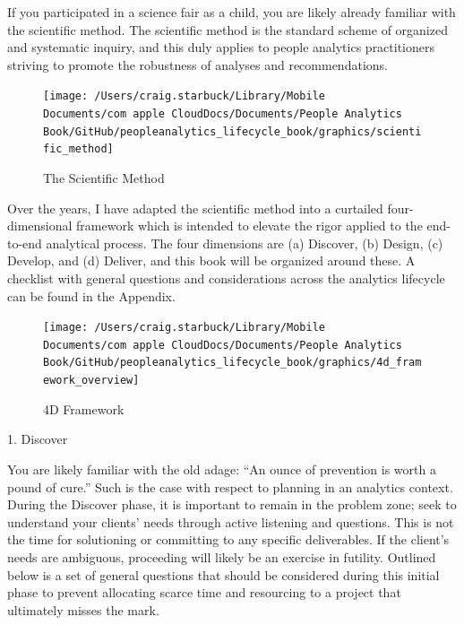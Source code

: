 \documentclass[]{book}
\begin{document}
If you participated in a science fair as a child, you are likely already familiar with the scientific method. The scientific method is the standard scheme of organized and systematic inquiry, and this duly applies to people analytics practitioners striving to promote the robustness of analyses and recommendations.

\begin{figure}

{\centering \texttt{[image: /Users/craig.starbuck/Library/Mobile Documents/com~apple~CloudDocs/Documents/People Analytics Book/GitHub/peopleanalytics\_lifecycle\_book/graphics/scientific\_method]} 

}

\caption{The Scientific Method}\label{fig:sci-method}
\end{figure}

Over the years, I have adapted the scientific method into a curtailed four-dimensional framework which is intended to elevate the rigor applied to the end-to-end analytical process. The four dimensions are (a) Discover, (b) Design, (c) Develop, and (d) Deliver, and this book will be organized around these. A checklist with general questions and considerations across the analytics lifecycle can be found in the Appendix.

\begin{figure}

{\centering \texttt{[image: /Users/craig.starbuck/Library/Mobile Documents/com~apple~CloudDocs/Documents/People Analytics Book/GitHub/peopleanalytics\_lifecycle\_book/graphics/4d\_framework\_overview]} 

}

\caption{4D Framework}\label{fig:4d-framework}
\end{figure}

1. Discover

You are likely familiar with the old adage: ``An ounce of prevention is worth a pound of cure.'' Such is the case with respect to planning in an analytics context. During the Discover phase, it is important to remain in the problem zone; seek to understand your clients' needs through active listening and questions. This is not the time for solutioning or committing to any specific deliverables. If the client's needs are ambiguous, proceeding will likely be an exercise in futility. Outlined below is a set of general questions that should be considered during this initial phase to prevent allocating scarce time and resourcing to a project that ultimately misses the mark.
\end{document}
